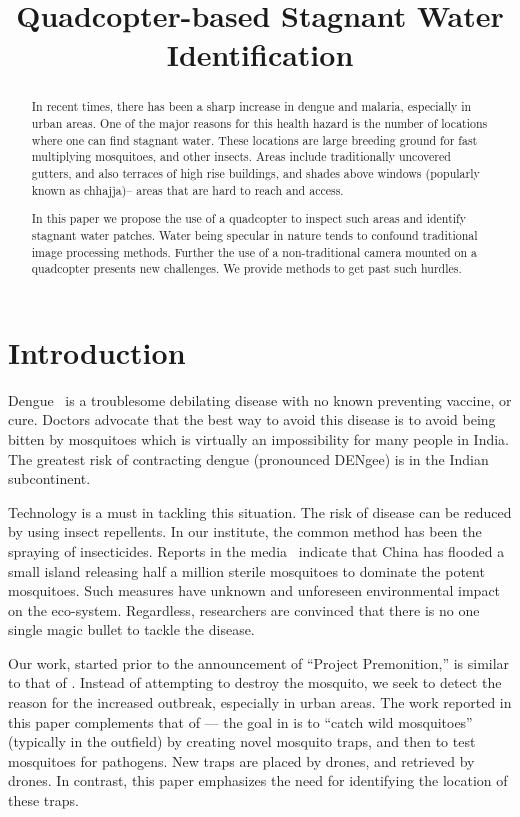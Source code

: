 \documentclass[times,10pt,twocolumn]{article}
\title{Quadcopter-based Stagnant Water Identification}
\author{}
\begin{document}
\maketitle

\begin{abstract}

  In recent times, there has been a sharp increase in dengue and 
  malaria, especially in urban areas. One of the major reasons for
  this health hazard is the number of locations where one can find
  stagnant water. These locations are large breeding ground for fast
  multiplying mosquitoes, and other insects.  Areas include
  traditionally uncovered gutters, and also terraces of high rise
  buildings, and shades above windows (popularly known as chhajja)--
  areas that are hard to reach and access.

  In this paper we propose the use of a quadcopter to inspect such
  areas and identify stagnant water patches.  Water being specular in
  nature tends to confound traditional image processing methods.
  Further the use of a non-traditional camera mounted on a quadcopter
  presents new challenges.  We provide methods to get past such
  hurdles.

\end{abstract}

\section{Introduction}
Dengue~\cite{WHO15Dengue} is a troublesome debilating disease with no
known preventing vaccine, or cure. Doctors advocate that the best way
to avoid this disease is to avoid being bitten by mosquitoes which is
virtually an impossibility for many people in India.  The greatest
risk of contracting dengue (pronounced DENgee) is in the Indian
subcontinent.  

Technology is a must in tackling this situation.  The risk of disease
can be reduced by using insect repellents. In our institute, the
common method has been the spraying of insecticides.  Reports in the
media~\cite{china} indicate that China has flooded a small island
releasing half a million sterile mosquitoes to dominate the potent
mosquitoes. Such measures have unknown and unforeseen environmental
impact on the eco-system. Regardless, researchers are convinced that
there is no one single magic bullet to tackle the disease. 

Our work, started prior to the announcement of ``Project
Premonition,'' is similar to that of \cite{Microsoft15}.  Instead of
attempting to destroy the mosquito, we seek to detect the reason for
the increased outbreak, especially in urban areas.  The work reported
in this paper complements that of \cite{Microsoft15} --- the goal in \cite{Microsoft15}
is to ``catch wild mosquitoes'' (typically in the outfield) by
creating novel mosquito traps, and then to test mosquitoes for
pathogens. New traps are placed by drones, and retrieved by drones.
In contrast, this paper emphasizes the need for identifying the
location of these traps.  
\end{document}
